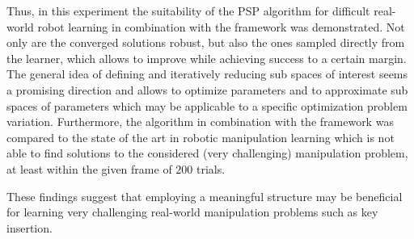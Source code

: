 Thus, in this experiment the suitability of the PSP algorithm for difficult real-world robot learning in combination with the \skillmodelabbr{} framework was demonstrated.
Not only are the converged solutions robust, but also the ones sampled directly from the learner, which allows to improve while achieving success to a certain margin.
The general idea of defining and iteratively reducing sub spaces of interest seems a promising direction and allows to optimize parameters and to approximate sub spaces of parameters which may be applicable to a specific optimization problem variation.
Furthermore, the algorithm in combination with the \skillmodelabbr{} framework was compared to the state of the art in robotic manipulation learning which is not able to find solutions to the considered (very challenging) manipulation problem, at least within the given frame of $200$ trials.

These findings suggest that employing a meaningful structure may be beneficial for learning very challenging real-world manipulation problems such as key insertion.